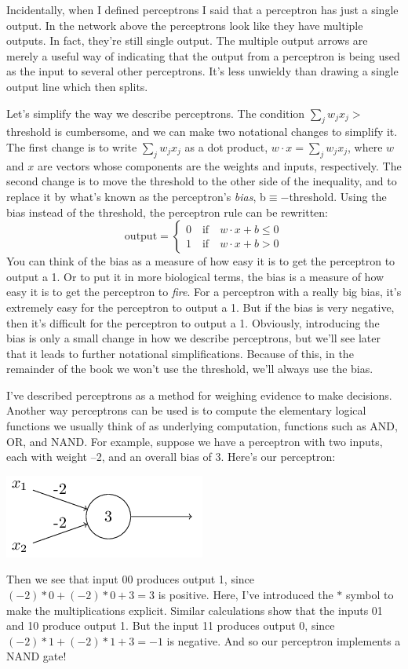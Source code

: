 \documentclass[a4paper,twoside,10pt]{book}
\begin{document}
Incidentally, when I defined perceptrons I said that a perceptron has just a single output. In the network above the perceptrons look like they have multiple outputs. In fact, they're still single output. The multiple output arrows are merely a useful way of indicating that the output from a perceptron is being used as the input to several other perceptrons. It's less unwieldy than drawing a single output line which then splits.

Let's simplify the way we describe perceptrons. The condition $\sum_j w_jx_j>$threshold is cumbersome, and we can make two notational changes to simplify it. The first change is to write $\sum_j w_jx_j$ as a dot product, $w\cdot x = \sum_j w_jx_j$, where $w$ and $x$ are vectors whose components are the weights and inputs, respectively. The second change is to move the threshold to the other side of the inequality, and to replace it by what's known as the perceptron's \textit{bias}, b$\equiv-$threshold. Using the bias instead of the threshold, the perceptron rule can be rewritten:
\begin{equation}
\textrm{output} = \begin{cases}
0 \quad \textrm{if}\quad w\cdot x + b  \le 0 \\
1 \quad \textrm{if}\quad w\cdot x + b  > 0
\end{cases}
\end{equation}
You can think of the bias as a measure of how easy it is to get the perceptron to output a 1. Or to put it in more biological terms, the bias is a measure of how easy it is to get the perceptron to \textit{fire}. For a perceptron with a really big bias, it's extremely easy for the perceptron to output a 1. But if the bias is very negative, then it's difficult for the perceptron to output a 1. Obviously, introducing the bias is only a small change in how we describe perceptrons, but we'll see later that it leads to further notational simplifications. Because of this, in the remainder of the book we won't use the threshold, we'll always use the bias.

I've described perceptrons as a method for weighing evidence to make decisions. Another way perceptrons can be used is to compute the elementary logical functions we usually think of as underlying computation, functions such as AND, OR, and NAND. For example, suppose we have a perceptron with two inputs, each with weight --2, and an overall bias of 3. Here's our perceptron:
\begin{center}
	\includegraphics[scale=0.5]{./figures/ch1/tikz2}
\end{center}
Then we see that input 00 produces output 1, since $(-2)\ast0+(-2)\ast0+3=3$ is positive. Here, I've introduced the $\ast$ symbol to make the multiplications explicit. Similar calculations show that the inputs 01 and 10 produce output 1. But the input 11 produces output 0, since $(-2)\ast1+(-2)\ast1+3=-1$ is negative. And so our perceptron implements a NAND gate!
\end{document}
